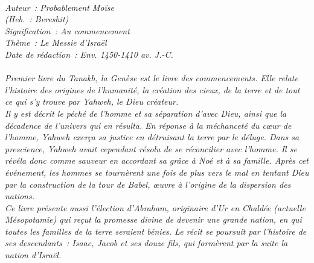\BFont
\noindent\hrulefill
{\footnotesize
\textit{
\bigskip
{\centering{}
\\Auteur~: Probablement Moïse
\\(Heb.~: Bereshit)
\\Signification~: Au commencement
\\Thème~: Le Messie d'Israël
\\Date de rédaction~: Env. 1450-1410 av. J.-C.\\}
}
\textit{
\\Premier livre du Tanakh, la Genèse est le livre des commencements. Elle relate l'histoire des origines de l'humanité, la création des cieux, de la terre et de tout ce qui s'y trouve par Yahweh, le Dieu créateur.
\\Il y est décrit le péché de l'homme et sa séparation d'avec Dieu, ainsi que la décadence de l'univers qui en résulta. En réponse à la méchanceté du cœur de l'homme, Yahweh exerça sa justice en détruisant la terre par le déluge. Dans sa prescience, Yahweh avait cependant résolu de se réconcilier avec l'homme. Il se révéla donc comme sauveur en accordant sa grâce à Noé et à sa famille. Après cet événement, les hommes se tournèrent une fois de plus vers le mal en tentant Dieu par la construction de la tour de Babel, œuvre à l'origine de la dispersion des nations.
\\Ce livre présente aussi l'élection d'Abraham, originaire d'Ur en Chaldée (actuelle Mésopotamie) qui reçut la promesse divine de devenir une grande nation, en qui toutes les familles de la terre seraient bénies. Le récit se poursuit par l'histoire de ses descendants~: Isaac, Jacob et ses douze fils, qui formèrent par la suite la nation d'Israël.\bigskip
}
}
\par\nobreak\noindent\hrulefill

